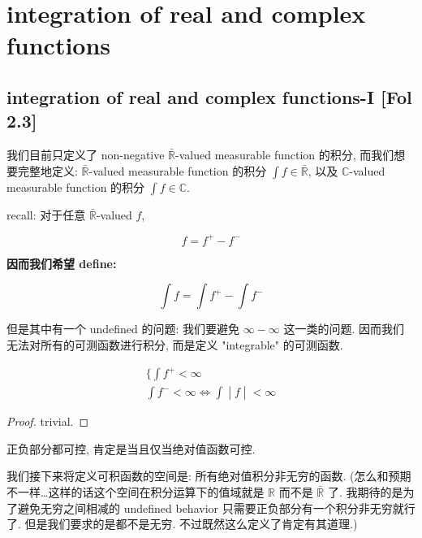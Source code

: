 \chapter{integration of real and complex functions}\label{integration-of-real-and-complex-functions}

\section{integration of real and complex functions-I {[}Fol 2.3{]}}

我们目前只定义了 non-negative \(\bar{\mathbb{R}}\)-valued measurable function 的积分, 而我们想要完整地定义: \(\bar{\mathbb{R}}\)-valued measurable function 的积分 \(\int f \in \bar{\mathbb{R}}\), 以及 \(\mathbb{C}\)-valued measurable function 的积分 \(\int f \in \mathbb{C}\).

recall: 对于任意 \(\bar{\mathbb{R}}\)-valued \(f\),

\[f = f^{+} - f^{-}\]

\textbf{因而我们希望 define:}

\[\int f = \int f^{+} - \int f^{-}\]

但是其中有一个 undefined 的问题: 我们要避免 \(\infty - \infty\) 这一类的问题. 因而我们无法对所有的可测函数进行积分, 而是定义 "integrable" 的可测函数.

\begin{lemma}

\[\begin{matrix}
{\{\int f^{+} < \infty} \\
\left. \int f^{-} < \infty\Leftrightarrow\int \middle| f \middle| < \infty \right.
\end{matrix}\]

\end{lemma}

\begin{proof}

trivial.

\end{proof}

正负部分都可控, 肯定是当且仅当绝对值函数可控.

我们接下来将定义可积函数的空间是: 所有绝对值积分非无穷的函数. (怎么和预期不一样\ldots 这样的话这个空间在积分运算下的值域就是 \(\mathbb{R}\) 而不是 \(\bar{\mathbb{R}}\) 了. 我期待的是为了避免无穷之间相减的 undefined behavior 只需要正负部分有一个积分非无穷就行了. 但是我们要求的是都不是无穷. 不过既然这么定义了肯定有其道理.)

